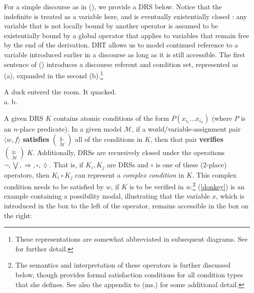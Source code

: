 For a simple discourse as in (\nextx), we provide a DRS below. Notice that the indefinite is treated as a variable here, and is eventually existentially closed \citep{Heim}: any variable that is not locally bound by another operator is assumed to be existentially bound by a global operator that applies to variables that remain free by the end of the derivation. DRT allows us to model continued reference to a variable introduced earlier in a discourse as long as it is still accessible. The first sentence of () introduces a discourse referent and condition set, represented as (a), expanded in the second (b).\footnote{These representations are somewhat abbreviated in subsequent diagrams. See \citet{Kamp1993} for further detail.}


	\pex A duck entered the room. It quacked.\\
		a.  \hspace*{1in}	b. 

	\xe
	

\vspace{1em}

A given DRS $ K $ contains atomic conditions of the form $ P(x_{i_1}...x_{i_n}) $ (where $ P $ is an $ n $-place predicate). In a given model $ \mathcal M $, if a world/variable-assignment pair $ \langle w,f\rangle $ \textbf{satisfies} $ (\underset{\scriptscriptstyle{\mathcal M}}{\boldsymbol{\Vdash}}) $ all of the conditions in $ K $, then that pair \textbf{verifies} $(\underset{\scriptscriptstyle{\mathcal M}}{\boldsymbol{\vDash}}) \;K$. Additionally, DRSs are recursively closed under the operations $ \neg,\bigvee,\Rightarrow,\square,\lozenge $. That is, if $ K_i,K_j $ are DRSs and $ \circ $ is one of these (2-place) operators, then $ K_i\circ K_j $ can represent a \textit{complex condition} in $ K $. This complex condition needs to be satisfied by $ w $, if $ K $ is to be verified in $ w $.\footnote{The semantics and interpretation of these operators is further discussed below, though \citet[714]{Roberts1989} provides formal satisfaction conditions for all condition types that she defines. See also the appendix to \citeauthor{PhilKotek} (ms.) for some additional detail.} (\ref{donkey}) is an example containing a possibility modal, illustrating that the variable $x$, which is introduced in the box to the left of the operator, remains accessible in the box on the right: 



